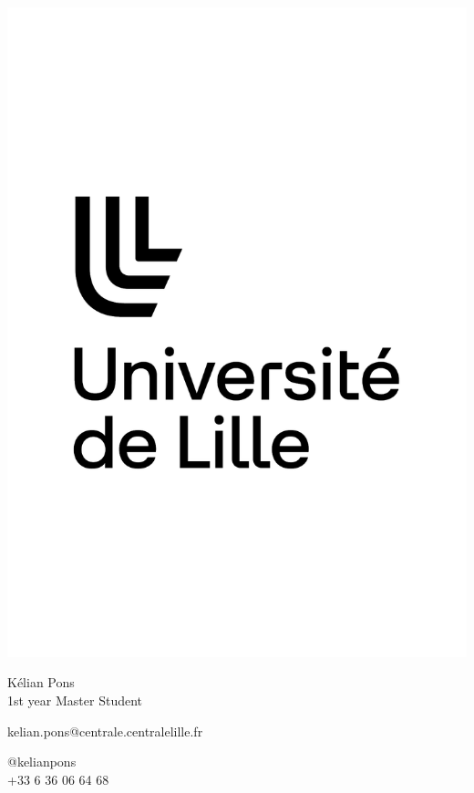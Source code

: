 \documentclass{article}
\begin{document}
\centering \includegraphics[width=.25\linewidth]{logo}\\[5pt]
\parbox{2in}{\Large \centering Kélian Pons\\[1pt]
\normalsize 1st year Master Student}

\vfill
\raggedright
\begin{multicols}{2}
kelian.pons@centrale.centralelille.fr

\columnbreak
\raggedleft
@kelianpons\\
+33 6 36 06 64 68%
\end{multicols}%
\end{document}
